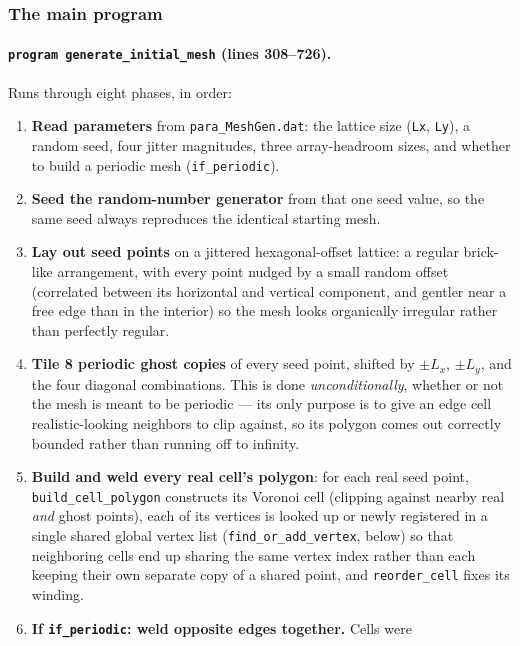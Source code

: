 \documentclass[11pt]{article}
\begin{document}
\subsubsection*{The main program}

\paragraph{\texttt{program generate\_initial\_mesh} (lines 308--726).}
Runs through eight phases, in order:

\begin{enumerate}[nosep, leftmargin=1.7em]
  \item \textbf{Read parameters} from \texttt{para\_MeshGen.dat}: the lattice size
  (\texttt{Lx}, \texttt{Ly}), a random seed, four jitter magnitudes, three array-headroom
  sizes, and whether to build a periodic mesh (\texttt{if\_periodic}).
  \item \textbf{Seed the random-number generator} from that one seed value, so the same
  seed always reproduces the identical starting mesh.
  \item \textbf{Lay out seed points} on a jittered hexagonal-offset lattice: a regular
  brick-like arrangement, with every point nudged by a small random offset (correlated
  between its horizontal and vertical component, and gentler near a free edge than in
  the interior) so the mesh looks organically irregular rather than perfectly regular.
  \item \textbf{Tile 8 periodic ghost copies} of every seed point, shifted by $\pm L_x$,
  $\pm L_y$, and the four diagonal combinations. This is done \emph{unconditionally},
  whether or not the mesh is meant to be periodic --- its only purpose is to give an
  edge cell realistic-looking neighbors to clip against, so its polygon comes out
  correctly bounded rather than running off to infinity.
  \item \textbf{Build and weld every real cell's polygon}: for each real seed point,
  \texttt{build\_cell\_polygon} constructs its Voronoi cell (clipping against nearby
  real \emph{and} ghost points), each of its vertices is looked up or newly registered
  in a single shared global vertex list (\texttt{find\_or\_add\_vertex}, below) so that
  neighboring cells end up sharing the same vertex index rather than each keeping their
  own separate copy of a shared point, and \texttt{reorder\_cell} fixes its winding.
  \item \textbf{If \texttt{if\_periodic}: weld opposite edges together.} Cells were

\end{enumerate}
\end{document}
